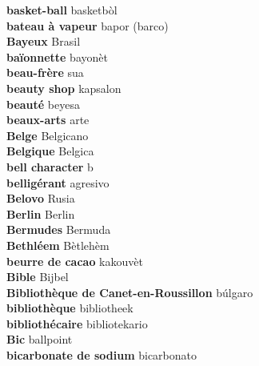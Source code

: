 \textbf{ basket-ball  } basketbòl \\
\textbf{ bateau à vapeur  } bapor (barco) \\
\textbf{ Bayeux  } Brasil \\
\textbf{ baïonnette  } bayonèt \\
\textbf{ beau-frère  } sua \\
\textbf{ beauty shop  } kapsalon \\
\textbf{ beauté  } beyesa \\
\textbf{ beaux-arts  } arte \\
\textbf{ Belge  } Belgicano \\
\textbf{ Belgique  } Belgica \\
\textbf{ bell character  } b \\
\textbf{ belligérant  } agresivo \\
\textbf{ Belovo  } Rusia \\
\textbf{ Berlin  } Berlin \\
\textbf{ Bermudes  } Bermuda \\
\textbf{ Bethléem  } Bètlehèm \\
\textbf{ beurre de cacao  } kakouvèt \\
\textbf{ Bible  } Bijbel \\
\textbf{ Bibliothèque de Canet-en-Roussillon  } búlgaro \\
\textbf{ bibliothèque  } bibliotheek \\
\textbf{ bibliothécaire  } bibliotekario \\
\textbf{ Bic  } ballpoint \\
\textbf{ bicarbonate de sodium  } bicarbonato \\
